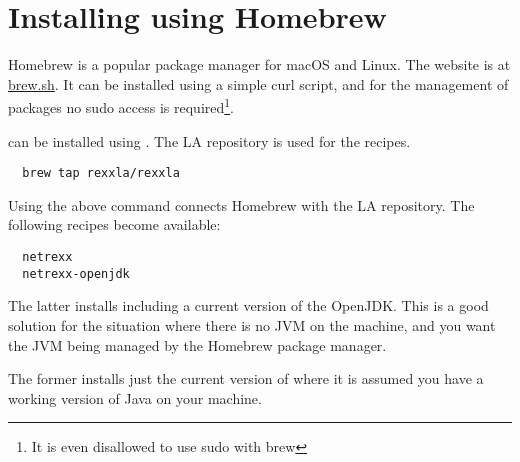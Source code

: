 \section{Installing using Homebrew}

Homebrew is a popular package manager for macOS and Linux. The website
is at \url{brew.sh}. It can be installed using a simple curl script,
and for the management of packages no sudo access is
required\footnote{It is even disallowed to use sudo with brew}.

\nr{} can be installed using . The \rexx{}LA repository is
used for the \nr{} recipes.

\begin{lstlisting}
  brew tap rexxla/rexxla
\end{lstlisting}

Using the above  command connects Homebrew with the
\rexx{}LA repository. The following recipes become available:

\begin{lstlisting}
  netrexx
  netrexx-openjdk
\end{lstlisting}

The latter installs \nr{} including a current version of the
OpenJDK. This is a good solution for the situation where there is no
JVM on the machine, and you want the JVM being managed by the Homebrew
package manager.

The former installs just the current version of \nr{} where it is
assumed you have a working version of Java on your machine.


